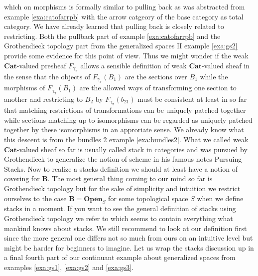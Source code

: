 which on morphisms is formally similar to pulling back as was abstracted from example \ref{exa:catofarrpb} with the arrow catgeory of the base category as total category. We have already learned that pulling back is closely related to restricting. Both the pullback part of example \ref{exa:catofarrpb} and the Grothendieck topology part from the generalized spaces II example \ref{exa:gs2} provide some evidence for this point of view. Thus we might wonder if the weak $\mathbf{Cat}$-valued presheaf $F_{\gamma_{\pi}}$ allows a sensible definition of weak $\mathbf{Cat}$-valued sheaf in the sense that the objects of $F_{\gamma_{\pi}}(B_{1})$ are the sections over $B_{1}$ while the morphisms of $F_{\gamma_{\pi}}(B_{1})$ are the allowed ways of transforming one section to another and restricting to $B_{2}$ by $F_{\gamma_{\pi}}(b_{21})$ must be consistent at least in so far that matching restrictions of transformations can be uniquely patched together while sections matching up to isomorphisms can be regarded as uniquely patched together by these isomorphisms in an approriate sense. We already know what this {\glqq}descent{\grqq} is from the bundles 2 example \ref{exa:bundles2}. What we called weak $\mathbf{Cat}$-valued sheaf so far is usually called {\glqq}stack in categories{\grqq} and was pursued by Grothendieck to generalize the notion of scheme in his famous notes {\glqq}Pursuing Stacks{\grqq}. Now to realize a stacks definition we should at least have a notion of covering for $\mathbf{B}$. The most general thing coming to our mind so far is Grothendieck topology but for the sake of simplicity and intuition we restrict ourselves to the case $\mathbf{B} = \mathbf{Open}_{S}$ for some topological space $S$ when we define stacks in a moment. If you want to see the general definition of stacks using Grothendieck topology we refer to \cite{d9dadd6d} which seems to contain everything what mankind knows about stacks. We still recommend to look at our definition first since the more general one differs not so much from ours on an intuitive level but might be harder for beginners to imagine. Let us wrap the stacks discussion up in a final fourth part of our continuant example about generalized spaces from examples \ref{exa:gs1}, \ref{exa:gs2} and \ref{exa:gs3}.
\\
